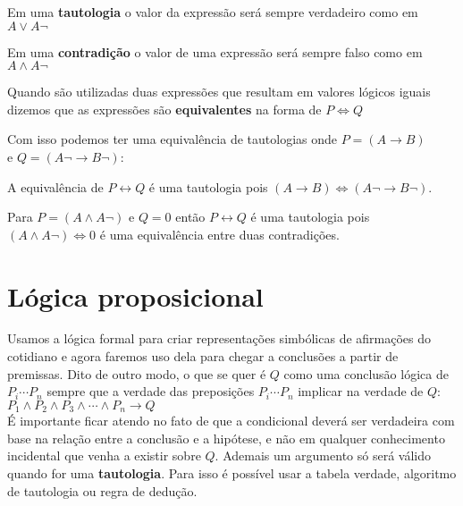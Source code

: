 Em uma \textbf{tautologia} o valor da expressão será sempre verdadeiro como em $ A \vee A\neg $

\noindent
Em uma \textbf{contradição} o valor de uma expressão será sempre falso como em $ A \wedge A\neg $

\noindent
Quando são utilizadas duas expressões que resultam em valores lógicos iguais dizemos que as expressões são \textbf{equivalentes} na forma de $ P \Leftrightarrow Q $

\noindent
Com isso podemos ter uma equivalência de tautologias onde $ P = (A \rightarrow B) $ \\ e $ Q = (A\neg \rightarrow B\neg) $:

A equivalência de $ P \leftrightarrow Q $ é uma tautologia pois $ (A \rightarrow B) \Leftrightarrow (A\neg \rightarrow B\neg) $.

Para $ P = (A \wedge A\neg) $  e $ Q = 0 $ então $ P \leftrightarrow Q $ é uma tautologia pois $ (A \wedge A\neg) \Leftrightarrow 0 $ é uma equivalência entre duas contradições. \\

\section{Lógica proposicional}

Usamos a lógica formal para criar representações simbólicas de afirmações do cotidiano e agora faremos uso dela para chegar a conclusões a partir de premissas. Dito de outro modo, o que se quer é $ Q $ como uma conclusão lógica de $ P_i \cdots P_n $ sempre que a verdade das preposições $ P_i \cdots P_n $ implicar na verdade de $ Q $: \\

$ P_1 \wedge P_2 \wedge P_3 \wedge \cdots \wedge P_n \rightarrow Q $\\

É importante ficar atendo no fato de que a condicional deverá ser verdadeira com base na relação entre a conclusão e a hipótese, e não em qualquer conhecimento incidental que venha a existir sobre $ Q $. Ademais um argumento só será válido quando for uma \textbf{tautologia}. Para isso é possível usar a tabela verdade, algoritmo de tautologia ou regra de dedução.





